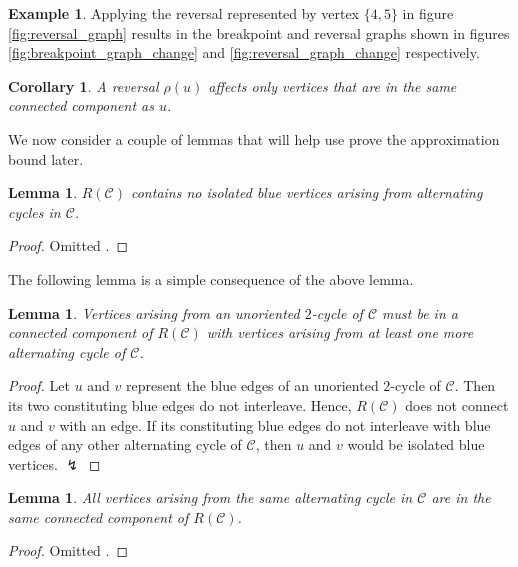 \documentclass[11pt,DIV=11]{scrartcl}
\def\padding{\vspace{2em}}
\newtheorem{corollary}{Corollary}[theorem]
\newtheorem{lemma}[theorem]{Lemma}
\theoremstyle{definition}
\newtheorem{example}{Example}[theorem]
\theoremstyle{remark}
\begin{document}
\begin{example}
Applying the reversal represented by vertex $\{4,5\}$ in figure \ref{fig:reversal_graph} results in the breakpoint and reversal graphs shown in figures \ref{fig:breakpoint_graph_change} and \ref{fig:reversal_graph_change} respectively.
\end{example}

\begin{corollary}
A reversal $\rho(u)$ affects only vertices that are in the same connected component as $u$.
\end{corollary}\padding

We now consider a couple of lemmas that will help use prove the approximation bound later.

\begin{lemma}
\label{lem:4}
$R(\mathcal{C})$ contains no isolated blue vertices arising from alternating cycles in $\mathcal{C}$.
\end{lemma}

\begin{proof}
Omitted \cite{Christie1998}.
\end{proof}

The following lemma is a simple consequence of the above lemma.

\begin{lemma}
\label{lem:5}
Vertices arising from an unoriented $2$-cycle of $\mathcal{C}$ must be in a connected component of $R(\mathcal{C})$ with vertices arising from at least one more alternating cycle of $\mathcal{C}$.
\end{lemma}

\begin{proof}
Let $u$ and $v$ represent the blue edges of an unoriented $2$-cycle of $\mathcal{C}$. Then its two constituting blue edges do not interleave. Hence, $R(\mathcal{C})$ does not connect $u$ and $v$ with an edge. If its constituting blue edges do not interleave with blue edges of any other alternating cycle of $\mathcal{C}$, then $u$ and $v$ would be isolated blue vertices. $\lightning$
\end{proof}

\begin{lemma}
\label{lem:6}
All vertices arising from the same alternating cycle in $\mathcal{C}$ are in the same connected component of $R(\mathcal{C})$.
\end{lemma}

\begin{proof}
Omitted \cite{Christie1998}.
\end{proof}\padding
\end{document}
